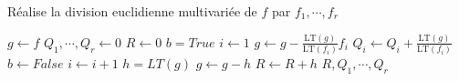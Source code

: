             \begin{algorithm}
                \caption{Réalise la division euclidienne multivariée de $f$ par $f_1, \cdots, f_r$}
                \begin{algorithmic}
                        \State $g \gets f$
                        \State $Q_1, \cdots, Q_r \gets 0$
                        \State $R \gets 0$
                            \State $b = True$
                            \State $i \gets 1$
                                    \State $g \gets g - \frac{\mathrm{LT}(g)}{\mathrm{LT}(f_i)} f_i$
                                    \State $Q_i \gets Q_i + \frac{\mathrm{LT}(g)}{\mathrm{LT}(f_i)}$
                                    \State $b \gets False$
                                \EndIf
                                \State $i \gets i + 1$
                            \EndWhile
                                \State $h = LT(g)$
                                \State $g \leftarrow g - h$
                                \State $R \leftarrow R + h$
                            \EndIf
                        \EndWhile
                        \State \Return $R,Q_1, \cdots, Q_r$
                    \EndFunction
                \end{algorithmic}
            \end{algorithm}

            \cleardoublepage

